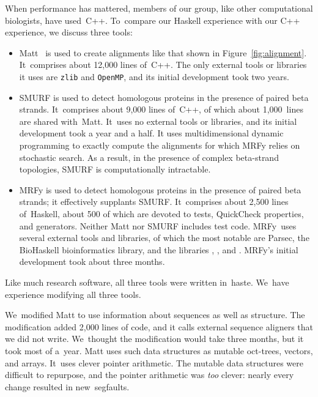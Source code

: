 \documentclass[]{jfp1}
\newcommand\mrfy{MRFy} %
\newcommand\figref[1]{Figure~\ref{fig:#1}}
\let\cite\citep
\begin{document}
When performance has mattered, members of our group, like other
computational biologists, have used~C++.
To~compare our Haskell experience with our C++ experience,
we discuss three tools:
\begin{itemize}
\item
Matt~\cite{Menke:2008wu} is used to create alignments like that shown
in \figref{alignment}.
It~comprises about 12,000 lines of~C++.
The only external tools or libraries it uses are \texttt{zlib}
and \texttt{OpenMP}, and its initial development took two years.
\item
SMURF
\cite{Menke:2010ti} is used to detect homologous proteins in the presence
of paired beta strands.
It~comprises about 9,000 lines of~C++, of which about 1,000~lines are
shared with~Matt.
It~uses no external tools or libraries, and
its initial development took a year and a half.
It uses multidimensional dynamic programming to exactly compute the alignments
for which MRFy relies on stochastic search.
As a result, in the presence of complex beta-strand topologies, SMURF is
computationally intractable.
\item
MRFy is used to detect homologous proteins in the presence of paired
beta strands; it effectively supplants SMURF.
It~comprises about 2,500 lines of~Haskell, about 500 of which are devoted
to tests, QuickCheck properties, and generators.
Neither Matt nor SMURF includes test code.
MRFy~uses several external tools and libraries, of which the most
notable are Parsec, the BioHaskell bioinformatics library, and
the libraries , ,
and .
\mrfy's initial development took about three months.
\end{itemize}
Like much research software, all three tools were written
 in~haste.
We~have experience modifying all three tools.

\ifpagetuning\enlargethispage{\baselineskip}\fi


We~modified Matt to use information about sequences as well as structure.
The modification added 2,000 lines of code, and it calls
external sequence aligners that we did not write.
We~thought the modification would take three months, 
but it took most of a~year.
Matt uses such
data structures as mutable oct-trees, vectors, and arrays.
It~uses clever pointer arithmetic.
The mutable data structures were difficult to 
repurpose, and the pointer arithmetic was \emph{too} clever: 
nearly every change resulted in new~segfaults.
\end{document}
